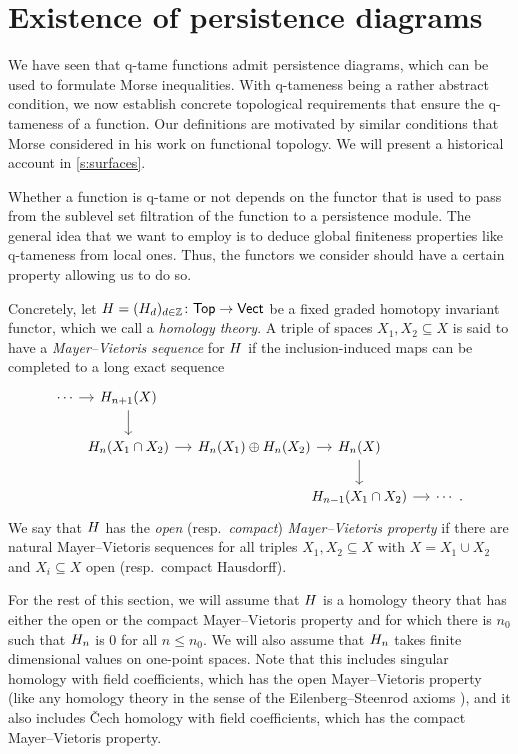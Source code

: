 
\section{Existence of persistence diagrams} \label{s:connectivity}

We have seen that q-tame functions admit persistence diagrams, which can be used to formulate Morse inequalities.
With q-tameness being a rather abstract condition, we now establish concrete topological requirements that ensure the q-tameness of a function.
Our definitions are motivated by similar conditions that Morse considered in his work on functional topology.
We will present a historical account in \cref{s:surfaces}.

Whether a function is q-tame or not depends on the functor that is used to pass from the sublevel set filtration of the function to a persistence module.
The general idea that we want to employ is to deduce global finiteness properties like q-tameness from local ones.
Thus, the functors we consider should have a certain property allowing us to do so.

Concretely, let $H = (H_d)_{d \in \mathbb{Z}} \colon \mathsf{Top} \to \mathsf{Vect}$ be a fixed graded homotopy invariant functor, which we call a \emph{homology theory}.
A triple of spaces $X_{1}, X_{2} \subseteq X$ is said to have a \emph{Mayer--Vietoris sequence} for $H$ if the inclusion-induced maps can be completed to a long exact sequence
\begin{equation*}
\begin{tikzcd}[column sep = small]
\cdots \arrow[r] &[-10pt] \H_{n+1}(X) \arrow[d] & &[-20pt] & \\
& \H_{n}(X_{1} \cap X_{2}) \arrow[r] &
\H_{n}(X_{1}) \oplus \H_{n}(X_{2}) \arrow[r] &
\H_{n}(X) \arrow[d] \\ & & &
\H_{n-1}(X_{1} \cap X_{2}) \arrow[r] &
\cdots \ .
\end{tikzcd}
\end{equation*}
We say that $H$ has the \emph{open} (resp.\@\ \emph{compact}) \emph{Mayer--Vietoris property} if there are natural Mayer--Vietoris sequences for all triples $X_{1}, X_{2} \subseteq X$ with $X = X_1 \cup X_2$ and $X_i \subseteq X$ open (resp.\@\ compact Hausdorff).

For the rest of this section, we will assume that $H$ is a homology theory that has either the open or the compact Mayer--Vietoris property and for which there is $n_0$ such that $H_{n}$ is 0 for all $n \leq n_0$.
We will also assume that $H_{n}$ takes finite dimensional values on one-point spaces.
Note that this includes singular homology with field coefficients, which has the open Mayer--Vietoris property (like any homology theory in the sense of the Eilenberg--Steenrod axioms \cite[Section I]{Eilenberg.1952}), and it also includes \v{C}ech homology with field coefficients, which has the compact Mayer--Vietoris property.

